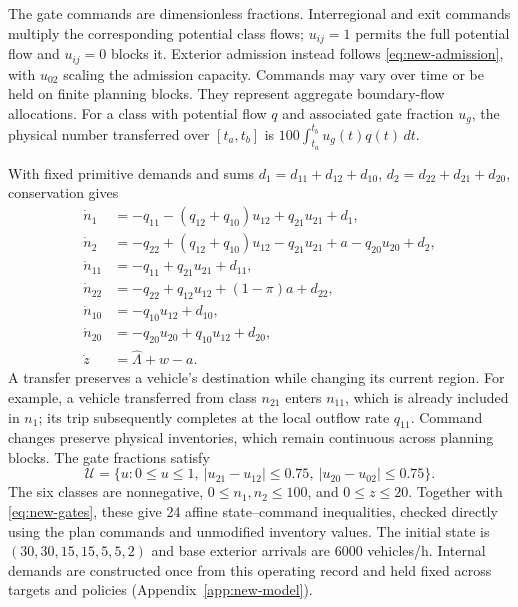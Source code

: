 \documentclass[journal,10pt]{IEEEtran}
\newcommand{\appref}[1]{Appendix~\ref{#1}}
\begin{document}
The gate commands are dimensionless fractions. Interregional and exit
commands multiply the corresponding potential class flows; $u_{ij}=1$
permits the full potential flow and $u_{ij}=0$ blocks it. Exterior
admission instead follows \eqref{eq:new-admission}, with $u_{02}$ scaling
the admission capacity. Commands may vary over time or be held on finite
planning blocks. They represent aggregate boundary-flow allocations.
For a class with potential flow $q$ and associated gate fraction $u_g$,
the physical number transferred over $[t_a,t_b]$ is
$100\int_{t_a}^{t_b}u_g(t)q(t)\,dt$.

With fixed primitive demands and sums
$d_1=d_{11}+d_{12}+d_{10}$, $d_2=d_{22}+d_{21}+d_{20}$, conservation gives
\begin{equation}
\begin{aligned}
\dot n_1&=-q_{11}-(q_{12}+q_{10})u_{12}+q_{21}u_{21}+d_1,\\
\dot n_2&=-q_{22}+(q_{12}+q_{10})u_{12}-q_{21}u_{21}
                 +a-q_{20}u_{20}+d_2,\\
\dot n_{11}&=-q_{11}+q_{21}u_{21}+d_{11},\\
\dot n_{22}&=-q_{22}+q_{12}u_{12}+(1-\pi)a+d_{22},\\
\dot n_{10}&=-q_{10}u_{12}+d_{10},\\
\dot n_{20}&=-q_{20}u_{20}+q_{10}u_{12}+d_{20},\\
\dot z&=\widehat\Lambda+w-a.
\end{aligned}
\label{eq:new-plant}
\end{equation}
A transfer preserves a vehicle's destination while changing its current
region. For example, a vehicle transferred from class $n_{21}$ enters
$n_{11}$, which is already included in $n_1$; its trip subsequently
completes at the local outflow rate $q_{11}$. Command changes preserve
physical inventories, which remain continuous across planning blocks.
The gate fractions satisfy
\begin{equation}
\mathcal U=\{u:0\le u\le1,\ |u_{21}-u_{12}|\le0.75,
\ |u_{20}-u_{02}|\le0.75\}.
\label{eq:new-gates}
\end{equation}
The six classes are nonnegative, $0\le n_1,n_2\le100$, and $0\le z\le20$.
Together with \eqref{eq:new-gates}, these give 24 affine state--command
inequalities, checked directly using the plan commands and unmodified
inventory values.
The initial state is $(30,30,15,15,5,5,2)$ and base exterior arrivals are
6000 vehicles/h. Internal demands are constructed once from this operating
record and held fixed across targets and policies
(\appref{app:new-model}).
\end{document}
